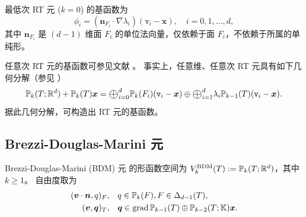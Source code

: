 最低次 RT 元 ($k=0$) 的基函数为 \cite[Section 2.6]{BoffiBrezziFortin2013}
$$
\phi_i=(\boldsymbol{n}_{F_i}\cdot\nabla\lambda_i)(\texttt{v}_i-\boldsymbol{x}),\quad i=0,1,\ldots,d,
$$
其中 $\boldsymbol{n}_{F_i}$ 是 $(d-1)$ 维面 $F_i$ 的单位法向量，仅依赖于面 $F_i$，不依赖于所属的单纯形。

任意次 RT 元的基函数可参见文献 \cite[Section 9, Tables 9.1-9.2]{ArnoldFalkWinther2009}。
事实上，任意维、任意次 RT 元具有如下几何分解（参见 \cite{ArnoldFalkWinther2009}）
$$
\mathbb P_k(T;\mathbb R^d)+\mathbb P_k(T)\bs x=\Oplus_{i=0}^d\mathbb P_{k}(F_{i})(\texttt{v}_i-\boldsymbol{x}) \oplus \Oplus_{i=1}^d\lambda_i\mathbb P_{k-1}(T)(\texttt{v}_i-\boldsymbol{x}).
$$
据此几何分解，可构造出 RT 元的基函数。



\subsection{Brezzi-Douglas-Marini 元}

Brezzi-Douglas-Marini (BDM) 元 \cite{BrezziDouglasMarini1985,BrezziDouglasDuranFortin1987,Nedelec1986,ChenHuang2022,ChenChenHuangWei2024,ChenHuang2024} 的形函数空间为 $V_k^{\rm BDM}(T):= \mathbb P_{k}(T; \mathbb R^d)$，其中 $k\geq1$。
自由度取为
\begin{subequations}\label{BDMfemdof}
\begin{align}
(\boldsymbol v\cdot\boldsymbol  n, q)_F, & \quad q\in\mathbb P_{k}(F),  F\in\Delta_{d-1}(T),\label{BDMfemdof1}\\
(\boldsymbol v, \boldsymbol q)_T, & \quad \boldsymbol q\in\operatorname{grad} \mathbb P_{k-1}(T)\oplus\mathbb P_{k-2}(T;\mathbb K)\boldsymbol x. \label{BDMfemdof2}
\end{align}
\end{subequations}



